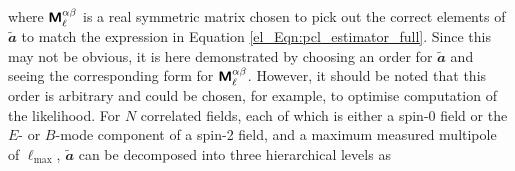 where $\bm{\mathsf{M}}_\ell^{\alpha \beta}$ is a real symmetric matrix chosen to pick out the correct elements of $\widetilde{\mathbfit{a}}$ to match the expression in Equation \eqref{el_Eqn:pcl_estimator_full}.
Since this may not be obvious, it is here demonstrated by choosing an order for $\widetilde{\mathbfit{a}}$ and seeing the corresponding form for $\bm{\mathsf{M}}_\ell^{\alpha \beta}$. However, it should be noted that this order is arbitrary and could be chosen, for example, to optimise computation of the likelihood.
For $N$ correlated fields, each of which is either a spin-0 field or the $E$- or $B$-mode component of a spin-2 field, and a maximum measured multipole of $\ell_\mathrm{max}$, $\widetilde{\mathbfit{a}}$ can be decomposed into three hierarchical levels as
